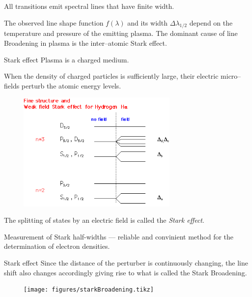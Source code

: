 \documentclass[final]{beamer}
\begin{document}
\begin{frame}
  All transitions emit spectral lines that have finite width.
  
  The observed line shape function $f(\lambda)$ and its width $\Delta \lambda_{1/2}$ depend on the temperature and pressure of the emitting plasma.
The dominant cause of line Broadening in plasma is the inter--atomic Stark effect.
\end{frame}
\begin{frame}{Stark effect}
  Plasma is a charged medium.

  When the density of charged particles is sufficiently large, their electric micro--fields perturb the atomic energy levels.
  \begin{figure}
      \includegraphics[width=0.7\textwidth]{figures/stark_effect_1.png}
  \end{figure}
  The splitting of states by an electric field is called the \emph{Stark effect}.

  Measurement of Stark half-widths --- reliable and convinient method for the determination of electron densities.
  \end{frame}
  \begin{frame}{Stark effect}
    Since the distance of the perturber is continuously changing, the line shift also changes accordingly giving rise to what is called the Stark Broadening.
    \begin{figure}
    \texttt{[image: figures/starkBroadening.tikz]}
    \end{figure}
  \end{frame}
\end{document}
